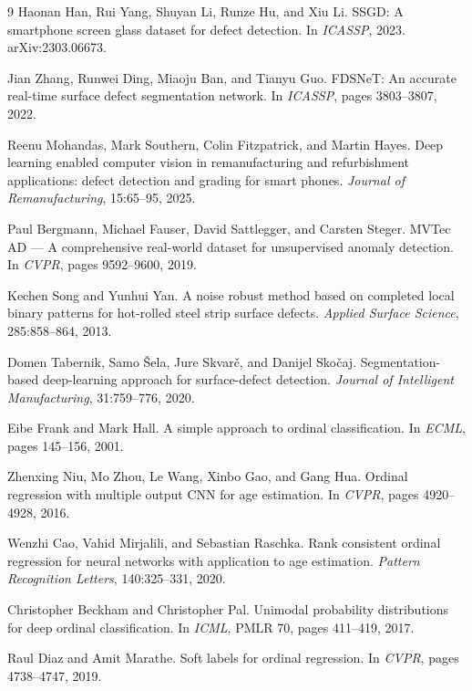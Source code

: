 \documentclass[10pt]{article}
\begin{document}
\begin{thebibliography}{9}
Haonan Han, Rui Yang, Shuyan Li, Runze Hu, and Xiu Li.
SSGD: A smartphone screen glass dataset for defect detection.
In \emph{ICASSP}, 2023. arXiv:2303.06673.

Jian Zhang, Runwei Ding, Miaoju Ban, and Tianyu Guo.
FDSNeT: An accurate real-time surface defect segmentation network.
In \emph{ICASSP}, pages 3803--3807, 2022.

Reenu Mohandas, Mark Southern, Colin Fitzpatrick, and Martin Hayes.
Deep learning enabled computer vision in remanufacturing and refurbishment applications: defect detection and grading for smart phones.
\emph{Journal of Remanufacturing}, 15:65--95, 2025.

Paul Bergmann, Michael Fauser, David Sattlegger, and Carsten Steger.
MVTec AD --- A comprehensive real-world dataset for unsupervised anomaly detection.
In \emph{CVPR}, pages 9592--9600, 2019.

Kechen Song and Yunhui Yan.
A noise robust method based on completed local binary patterns for hot-rolled steel strip surface defects.
\emph{Applied Surface Science}, 285:858--864, 2013.

Domen Tabernik, Samo \v{S}ela, Jure Skvar\v{c}, and Danijel Sko\v{c}aj.
Segmentation-based deep-learning approach for surface-defect detection.
\emph{Journal of Intelligent Manufacturing}, 31:759--776, 2020.

Eibe Frank and Mark Hall.
A simple approach to ordinal classification.
In \emph{ECML}, pages 145--156, 2001.

Zhenxing Niu, Mo Zhou, Le Wang, Xinbo Gao, and Gang Hua.
Ordinal regression with multiple output CNN for age estimation.
In \emph{CVPR}, pages 4920--4928, 2016.

Wenzhi Cao, Vahid Mirjalili, and Sebastian Raschka.
Rank consistent ordinal regression for neural networks with application to age estimation.
\emph{Pattern Recognition Letters}, 140:325--331, 2020.

Christopher Beckham and Christopher Pal.
Unimodal probability distributions for deep ordinal classification.
In \emph{ICML}, PMLR 70, pages 411--419, 2017.

Raul Diaz and Amit Marathe.
Soft labels for ordinal regression.
In \emph{CVPR}, pages 4738--4747, 2019.


\end{thebibliography}
\end{document}
